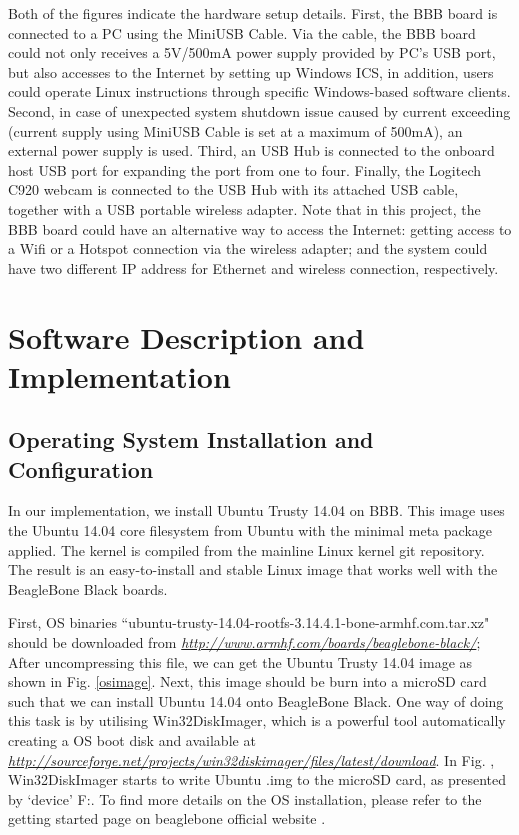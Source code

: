 \documentclass[12pt,journal,draftclsnofoot,onecolumn]{IEEEtran}
\begin{document}
Both of the figures indicate the hardware setup details. First, the BBB board is connected to a PC using the MiniUSB Cable. Via the cable, the BBB board could not only receives a 5V/500mA power supply provided by PC's USB port, but also accesses to the Internet by setting up Windows ICS, in addition, users could operate Linux instructions through specific Windows-based software clients. Second, in case of unexpected system shutdown issue caused by current exceeding (current supply using MiniUSB Cable is set at a maximum of 500mA), an external power supply is used. Third, an USB Hub is connected to the onboard host USB port for expanding the port from one to four. Finally, the Logitech C920 webcam is connected to the USB Hub with its attached USB cable, together with a USB portable wireless adapter. Note that in this project, the BBB board could have an alternative way to access the Internet: getting access to a Wifi or a Hotspot connection via the wireless adapter; and the system could have two different IP address for Ethernet and wireless connection, respectively.


\section{Software Description and Implementation}\label{SfDes}
	
	\subsection{Operating System Installation and Configuration}\label{Sys}
	In our implementation, we install Ubuntu Trusty 14.04 on BBB. This image uses the Ubuntu 14.04 core filesystem from Ubuntu with the minimal meta package applied. The kernel is compiled from the mainline Linux kernel git repository. The result is an easy-to-install and stable Linux image that works well with the BeagleBone Black boards.

First, OS binaries ``ubuntu-trusty-14.04-rootfs-3.14.4.1-bone-armhf.com.tar.xz" should be downloaded from \textcolor{blue}{\textit{\url{http://www.armhf.com/boards/beaglebone-black/}}}; After uncompressing this file, we can get the Ubuntu Trusty 14.04 image as shown in Fig. \ref{osimage}. Next, this image should be burn into a microSD card such that we can install Ubuntu 14.04 onto BeagleBone Black. One way of doing this task is by utilising Win32DiskImager, which is a powerful tool automatically creating a OS boot disk and available at \textcolor{blue}{\textit{\url{http://sourceforge.net/projects/win32diskimager/files/latest/download}}}. In Fig. , Win32DiskImager starts to write Ubuntu .img to the microSD card, as presented by `device' F:. To find more details on the OS installation, please refer to the getting started page on beaglebone official website \cite{startBB}.
\end{document}
